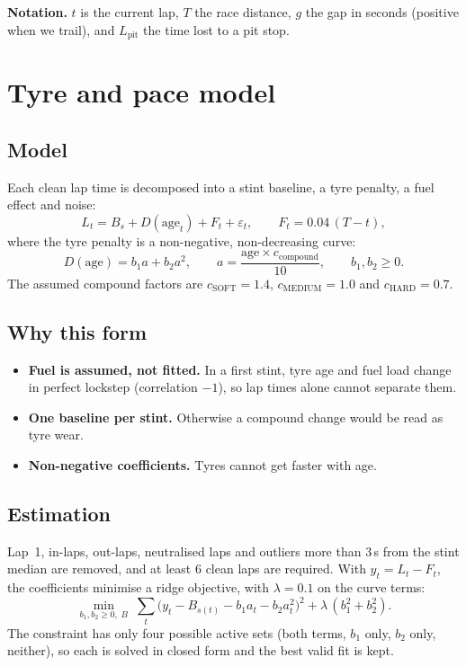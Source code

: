 \documentclass[11pt,a4paper]{article}
\begin{document}
\textbf{Notation.} $t$ is the current lap, $T$ the race distance, $g$ the gap in
seconds (positive when we trail), and $L_{\text{pit}}$ the time lost to a pit stop.

\section{Tyre and pace model}

\subsection{Model}
Each clean lap time is decomposed into a stint baseline, a tyre penalty, a fuel
effect and noise:
\begin{equation}
L_t = B_s + D(\text{age}_t) + F_t + \varepsilon_t,
\qquad F_t = 0.04\,(T-t),
\end{equation}
where the tyre penalty is a non-negative, non-decreasing curve:
\begin{equation}
D(\text{age}) = b_1 a + b_2 a^2,
\qquad a = \frac{\text{age}\times c_{\text{compound}}}{10},
\qquad b_1, b_2 \ge 0.
\end{equation}
The assumed compound factors are $c_{\text{SOFT}}=1.4$, $c_{\text{MEDIUM}}=1.0$ and
$c_{\text{HARD}}=0.7$.

\subsection{Why this form}
\begin{itemize}
  \item \textbf{Fuel is assumed, not fitted.} In a first stint, tyre age and fuel load
        change in perfect lockstep (correlation $-1$), so lap times alone cannot
        separate them.
  \item \textbf{One baseline per stint.} Otherwise a compound change would be read as
        tyre wear.
  \item \textbf{Non-negative coefficients.} Tyres cannot get faster with age.
\end{itemize}

\subsection{Estimation}
Lap~1, in-laps, out-laps, neutralised laps and outliers more than 3\,s from the stint
median are removed, and at least 6 clean laps are required. With $y_t = L_t - F_t$, the
coefficients minimise a ridge objective, with $\lambda = 0.1$ on the curve terms:
\begin{equation}
\min_{b_1,b_2\ge 0,\;B}\; \sum_t \bigl(y_t - B_{s(t)} - b_1 a_t - b_2 a_t^2\bigr)^2
+ \lambda\,(b_1^2+b_2^2).
\end{equation}
The constraint has only four possible active sets (both terms, $b_1$ only, $b_2$ only,
neither), so each is solved in closed form and the best valid fit is kept.
\end{document}
